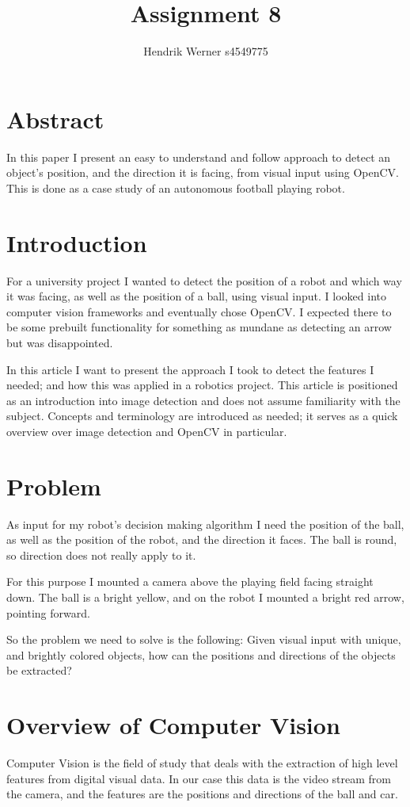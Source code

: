 \documentclass[12pt, a4paper]{article}
\title{Assignment 8}
\author{Hendrik Werner s4549775}
\begin{document}
\maketitle

\section{Abstract}
In this paper I present an easy to understand and follow approach to detect an object's position, and the direction it is facing, from visual input using OpenCV. This is done as a case study of an autonomous football playing robot.

\section{Introduction}
For a university project I wanted to detect the position of a robot and which way it was facing, as well as the position of a ball, using visual input. I looked into computer vision frameworks and eventually chose OpenCV. I expected there to be some prebuilt functionality for something as mundane as detecting an arrow but was disappointed.

In this article I want to present the approach I took to detect the features I needed; and how this was applied in a robotics project. This article is positioned as an introduction into image detection and does not assume familiarity with the subject. Concepts and terminology are introduced as needed; it serves as a quick overview over image detection and OpenCV in particular.

\section{Problem}
As input for my robot's decision making algorithm I need the position of the ball, as well as the position of the robot, and the direction it faces. The ball is round, so direction does not really apply to it.

For this purpose I mounted a camera above the playing field facing straight down. The ball is a bright yellow, and on the robot I mounted a bright red arrow, pointing forward.

So the problem we need to solve is the following: Given visual input with unique, and brightly colored objects, how can the positions and directions of the objects be extracted?

\section{Overview of Computer Vision}
Computer Vision is the field of study that deals with the extraction of high level features from digital visual data. In our case this data is the video stream from the camera, and the features are the positions and directions of the ball and car.
\end{document}

